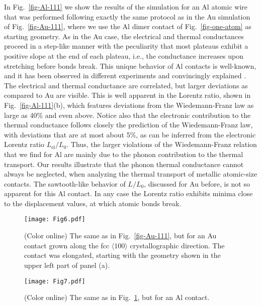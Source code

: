 \documentclass[aps,amsmath,amssymb,twocolumn,showpacs]{revtex4-1}
\begin{document}
In Fig.~\ref{fig-Al-111} we show the results of the
simulation for an Al atomic wire that was performed following exactly the
same protocol as in the Au simulation of Fig.~\ref{fig-Au-111}, where we use
the Al dimer contact of Fig.~\ref{fig-one-atom} as starting geometry. As in
the Au case, the electrical and thermal conductances proceed in a step-like
manner with the peculiarity that most plateaus exhibit a positive slope at the
end of each plateau, i.e., the conductance increases upon stretching before
bonds break. This unique behavior of Al contacts is well-known, and it has
been observed in different experiments and convincingly explained
\cite{Scheer1997,Scheer1998,Cuevas1998b,Jelinek2003}. The electrical and
thermal conductance are correlated, but larger deviations as compared to Au
are visible.  This is well apparent in the Lorentz ratio, shown in
Fig.~\ref{fig-Al-111}(b), which features deviations from the Wiedemann-Franz
law as large as 40\% and even above. Notice also that the electronic
contribution to the thermal conductance follows closely the prediction of the
Wiedemann-Franz law, with deviations that are at most about 5\%, as can be
inferred from the electronic Lorentz ratio $L_{\text{el}}/L_0$. Thus, the
larger violations of the Wiedemann-Franz relation that we find for Al are
mainly due to the phonon contribution to the thermal transport.  Our results
illustrate that the phonon thermal conductance cannot always be neglected,
when analyzing the thermal transport of metallic atomic-size contacts. The
sawtooth-like behavior of $L/L_0$, discussed for Au before, is not so apparent
for this Al contact. In any case the Lorentz ratio exhibits minima close to
the displacement values, at which atomic bonds break.

%
\begin{figure}[t]
\texttt{[image: Fig6.pdf]}
\caption{(Color online) The same as in Fig.~\ref{fig-Au-111}, but for an Au
  contact grown along the fcc $\langle 100 \rangle$ crystallographic
  direction. The contact was elongated, starting with the geometry shown in
  the upper left part of panel (a).}
\label{fig-Au-100}
\end{figure}
%

%
\begin{figure}[t]
\texttt{[image: Fig7.pdf]}
\caption{(Color online) The same as in Fig.~\ref{fig-Au-100}, but for an Al
  contact.} \label{fig-Al-100}
\end{figure}
%
\end{document}
